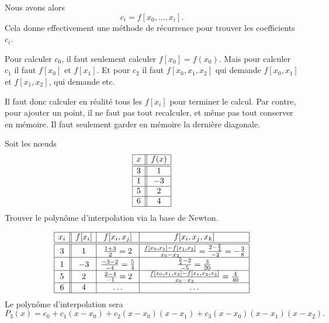 Nous avons alors
\begin{equation}
	c_i=f[x_0,\ldots, x_i].
\end{equation}
Cela donne effectivement une méthode de récurrence pour trouver les coefficients \( c_i\).

\begin{remark}
	Pour calculer \( c_0\), il faut seulement calculer \( f[x_0]=f(x_0)\). Mais pour calculer \( c_1\) il faut \( f[x_0] \) et \( f[x_1]\). Et pour \( c_2\) il faut \( f[x_0,x_1,x_2]\) qui demande \( f[x_0,x_1]\) et \( f[x_1,x_2]\), qui demande etc.

	Il faut donc calculer en réalité tous les \( f[x_i]\) pour terminer le calcul. Par contre, pour ajouter un point, il ne faut pas tout recalculer, et même pas tout conserver en mémoire. Il faut seulement garder en mémoire la dernière diagonale.
\end{remark}

\begin{example}

	Soit les nœuds
	\begin{equation*}
		\begin{array}[]{|c||c|}
			\hline
			x & f(x) \\
			\hline\hline
			3 & 1    \\
			\hline
			1 & -3   \\
			\hline
			5 & 2    \\
			\hline
			6 & 4    \\
			\hline
		\end{array}
	\end{equation*}
	Trouver le polynôme d'interpolation via la base de Newton.


	\begin{equation*}
		\begin{array}[]{|c||c|c|c|}
			\hline
			x_i & f[x_i] & f[x_i,x_j]                          & f[x_i,x_j,x_k]                                                                              \\
			\hline\hline
			3   & 1      & \frac{ 1+3 }{ 2 }=2                 & \frac{ f[x_0,x_1]-f[x_1,x_2] }{ x_0-x_2 }=\frac{ 2-\frac{ 5 }{ 4 } }{ -2 }=-\frac{ 3 }{ 8 } \\
			\hline
			1   & -3     & \frac{ -3-2 }{ -4 }=\frac{ 5 }{ 4 } & \frac{ \frac{ 5 }{ 4 }-2 }{ -5 }=\frac{ 3 }{ 20 }                                           \\
			\hline
			5   & 2      & \frac{ 2-4 }{ -1 }=2                & \frac{ f[x_0,x_1,x_2]-f[x_1,x_2,x_3] }{ x_0-x_3 }=\frac{ 4 }{ 40 }                          \\
			\hline
			6   & 4      & \ldots                              & \ldots                                                                                      \\
			\hline
		\end{array}
	\end{equation*}
	Le polynôme d'interpolation sera
	\begin{equation}
		P_3(x)=c_0+c_1(x-x_0)+c_2(x-x_0)(x-x_1)+c_3(x-x_0)(x-x_1)(x-x_2).
	\end{equation}

\end{example}

